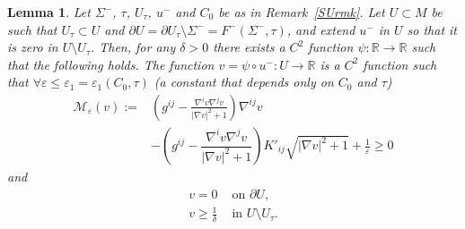 \documentclass[11pt]{amsart}
\newtheorem{Lemma}[Theorem]{Lemma}
\renewcommand{\epsilon}{\varepsilon}
\def\R{\mathbb{R}}
\def\e{\epsilon}
\def\t{\tau}
\begin{document}
\begin{Lemma}\label{barrier}
Let $\Sigma^-$, $\tau$, $U_\t$, $u^-$ and $C_0$ be as in Remark~\ref{SUrmk}. Let $U\subset M$ be such that $U_\t\subset U$ and $\partial U=\partial U_\t\setminus\Sigma^-=F^-(\Sigma^-, \tau)$, and extend $u^-$ in $U$ so that it is zero in $U\setminus U_\t$. Then, for any $\delta>0$ there exists a $C^2$ function $\psi:\R\to\R$ such that the following holds.  The function $v=\psi\circ u^-:U\to\R$ is a $C^2$ function such that $\forall \e\le\e_1=\e_1(C_0,\t)$  (a constant that depends only on $C_0$ and $\t$)
\[\begin{split}\mathcal M_\e(v):=& \left(g^{ij}-\frac{\nabla^iv\nabla^jv}{|\nabla v|^2+1}\right)\nabla^{ij}v\\
&-\left(g^{ij}-\dfrac{\nabla^iv \nabla^j v}{|\nabla v|^2+1}\right)K'_{ij} \sqrt{|\nabla v|^2+1}+\frac{1}{\e}\ge 0
\end{split}\]
 and 
\[\begin{split}v= 0&\text{ on  }\partial U, \\
v\ge \frac{1}{\delta}&\text{ in  }U\setminus U_\t.
\end{split}\]
\end{Lemma}
\end{document}
